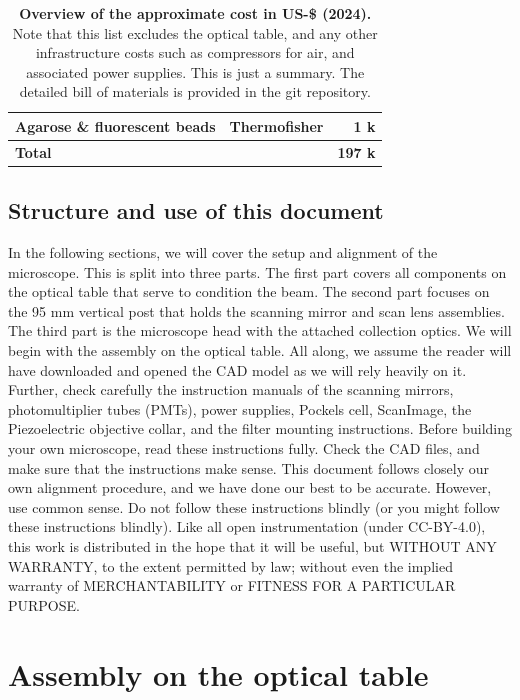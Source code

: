 \documentclass[10pt,letterpaper]{article}
\begin{document}
\begin{table}
\begin{center}
\begin{tabular}{ l c r }
                   Agarose \& fluorescent beads     & Thermofisher &  1 k \\
  \hline
 \textbf{Total}                    & & \textbf{197 k} \\
  \hline
  \end{tabular}
\end{center}
\caption{\textbf{Overview of the approximate cost in US-\$ (2024).} Note that this list excludes the optical table, and any other infrastructure costs such as compressors for air, and associated power supplies. This is just a summary. The detailed bill of materials is provided in the git repository.}\label{tab_costs}
\end{table}

\subsection{Structure and use of this document}
In the following sections, we will cover the setup and alignment of the microscope. This is split into three parts. The first part covers all components on the optical table that serve to condition the beam. The second part focuses on the  95 mm vertical post that holds the scanning mirror and scan lens assemblies. The third part is the microscope head with the attached collection optics. We will begin with the assembly on the optical table. All along, we assume the reader will have downloaded and opened the CAD model as we will rely heavily on it. Further, check carefully the instruction manuals of the scanning mirrors, photomultiplier tubes (PMTs), power supplies, Pockels cell, ScanImage, the Piezoelectric objective collar, and the filter mounting instructions.\newline
Before building your own microscope, read these instructions fully. Check the CAD files, and make sure that the instructions make sense. This document follows closely our own alignment procedure, and we have done our best to be accurate. However, use common sense. Do not follow these instructions blindly (or you might follow these instructions blindly). Like all open instrumentation (under CC-BY-4.0), this work is distributed in the hope that it will be useful, but WITHOUT ANY WARRANTY, to the extent permitted by law; without even the implied warranty of MERCHANTABILITY or FITNESS FOR A PARTICULAR PURPOSE. 

\section{Assembly on the optical table}
%
\end{document}
